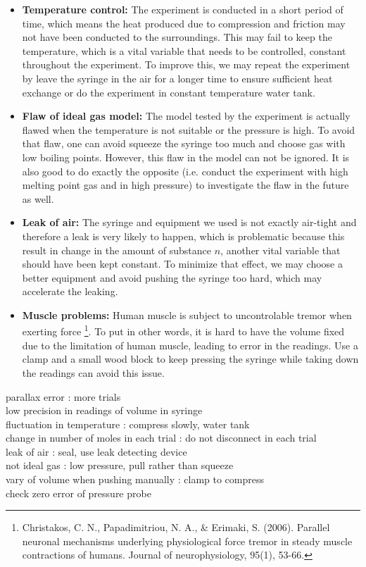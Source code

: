 \documentclass[a4paper]{article}
\begin{document}
\begin{itemize}
  \item \textbf{Temperature control:} The experiment is conducted in a short period of time, which means the heat produced due to compression and friction may not have been conducted to the surroundings. This may fail to keep the temperature, which is a vital variable that needs to be controlled, constant throughout the experiment. To improve this, we may repeat the experiment by leave the syringe in the air for a longer time to ensure sufficient heat exchange or do the experiment in constant temperature water tank.
  \item \textbf{Flaw of ideal gas model:} The model tested by the experiment is actually flawed when the temperature is not suitable or the pressure is high. To avoid that flaw, one can avoid squeeze the syringe too much and choose gas with low boiling points. However, this flaw in the model can not be ignored. It is also good to do exactly the opposite (i.e. conduct the experiment with high melting point gas and in high pressure) to investigate the flaw in the future as well.
  \item \textbf{Leak of air:} The syringe and equipment we used is not exactly air-tight and therefore a leak is very likely to happen, which is problematic because this result in change in the amount of substance $n$, another vital variable that should have been kept constant. To minimize that effect, we may choose a better equipment and avoid pushing the syringe too hard, which may accelerate the leaking.
  \item \textbf{Muscle problems:} Human muscle is subject to uncontrolable tremor when exerting force \footnote{Christakos, C. N., Papadimitriou, N. A., \& Erimaki, S. (2006). Parallel neuronal mechanisms underlying physiological force tremor in steady muscle contractions of humans. Journal of neurophysiology, 95(1), 53-66.}. To put in other words, it is hard to have the volume fixed due to the limitation of human muscle, leading to error in the readings. Use a clamp and a small wood block to keep pressing the syringe while taking down the readings can avoid this issue. 
\end{itemize}

\begin{tcolorbox}[title = Note]
    parallax error : 								more trials \\
    low precision in readings of volume in syringe \\
    fluctuation in temperature : 					compress slowly, water tank \\
    change in number of moles in each trial :			do not disconnect in each trial \\
    leak of air : 									seal, use leak detecting device \\
    not ideal gas : 								low pressure, pull rather  than squeeze \\
    vary of volume when pushing manually : 			clamp to compress \\
    check zero error of pressure probe 
\end{tcolorbox}
\end{document}
